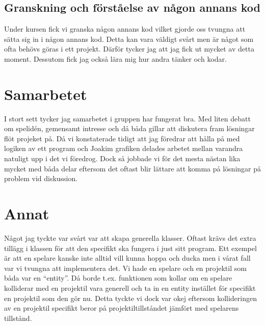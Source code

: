 \documentclass{TDP003mall}
\begin{document}
	\subsection{Granskning och förståelse av någon annans kod}
	Under kursen fick vi granska någon annans kod vilket gjorde oss tvungna att sätta sig in i någon annans kod. Detta kan vara väldigt svårt men är något som ofta behövs göras i ett projekt. Därför tycker jag att jag fick ut mycket av detta moment. Dessutom fick jag också lära mig hur andra tänker och kodar.
	
	\section{Samarbetet}
	I stort sett tycker jag samarbetet i gruppen har fungerat bra. Med liten debatt om spelidén, gemensamt intresse och då båda gillar att diskutera fram lösningar flöt projeket på. Då vi konstaterade tidigt att jag föredrar att hålla på med logiken av ett program och Joakim grafiken delades arbetet mellan varandra natuligt upp i det vi föredrog. Dock så jobbade vi för det mesta nästan lika mycket med båda delar eftersom det oftast blir lättare att komma på lösningar på problem vid diskussion.
	
	\section{Annat}
	Något jag tyckte var svårt var att skapa generella klasser. Oftast krävs det extra tillägg i klassen för att den specifikt ska fungera i just sitt program. Ett exempel är att en spelare kanske inte alltid vill kunna hoppa och ducka men i vårat fall var vi tvungna att implementera det. Vi hade en spelare och en projektil som båda var en “entity”. Då borde t.ex. funktionen som kollar om en spelare kolliderar med en projektil vara generell och ta in en entity instället för specifikt en projektil som den gör nu. Detta tyckte vi dock var okej eftersom kollideringen av en projektil specifikt beror på projektiltillståndet jämfört med spelarens tillstånd.
\end{document}

